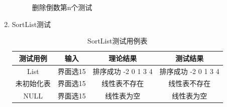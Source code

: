 \documentclass[supercite]{HustGraduPaper}
\theoremstyle{definition}
\begin{document}
\begin{enumerate}
\begin{figure}[htb]
		      \caption{删除倒数第n个测试}
	      \end{figure}
	      \newpage
	\item SortList测试
	      \begin{table}[htb]
		      \begin{center}
			      \setlength{\tabcolsep}{2.0mm}
			      \caption{SortList测试用例表}
			      \label{table18}
			      \begin{tabular}{|c|c|c|c|}
				      \hline
				      测试用例   & 输入     & 理论结果            & 测试结果            \\
				      \hline
				      \hline
				      List       & 界面选15 & 排序成功 -2 0 1 3 4 & 排序成功 -2 0 1 3 4 \\
				      \hline
				      未初始化表 & 界面选15 & 线性表不存在        & 线性表不存在        \\
				      \hline
				      NULL       & 界面选15 & 线性表为空          & 线性表为空          \\
				      \hline
			      \end{tabular}
		      \end{center}
	      \end{table}
	      \begin{figure}[htb]
		      \centering
		      \quad
		      \quad
		      \\

\end{figure}
\end{enumerate}
\end{document}
